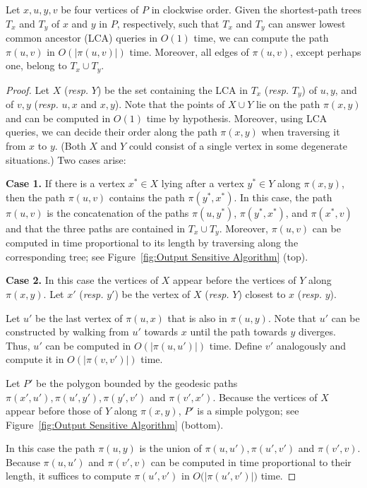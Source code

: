 \documentclass[a4paper,UKenglish]{lipics}
\newcommand{\p}[2]{\ensuremath{\pi(#1, #2)}}
\begin{document}
\begin{lemma}\label{lemma:Suri's lemma}
Let $x, u, y, v$ be four vertices of $P$ in clockwise order.
Given the shortest-path trees $T_x$ and $T_y$ of $x$ and $y$ in $P$, respectively, such that $T_x$ and $T_y$ can answer lowest common ancestor (LCA) queries in $O(1)$ time, 
we can compute the path $\p{u}{v}$ in $O(|\p{u}{v}|)$ time. 
Moreover, all edges of $\p{u}{v}$, except perhaps one, belong to $T_x\cup T_y$.
\end{lemma}
\begin{proof}
Let $X$ (\emph{resp.} $Y$) be the set containing the LCA in $T_x$ (\emph{resp.} $T_y$) of $u,y$, and of $v,y$ (\emph{resp.} $u,x$ and $x,y$). Note that the points of $X\cup Y$ lie on the path $\p{x}{y}$ and can be computed in $O(1)$ time by hypothesis. Moreover, using LCA queries, we can decide their order along the path $\p{x}{y}$ when traversing it from $x$ to $y$. (Both $X$ and $Y$ could consist of a single vertex in some degenerate situations.) Two cases arise: 

\textbf{Case 1.} If there is a vertex  $x^*\in X$ lying after a vertex $y^*\in Y$ along $\p{x}{y}$, 
then the path $\p{u}{v}$ contains the path $\p{y^*}{x^*}$. 
In this case, the path $\p{u}{v}$ is the concatenation of the paths $\p{u}{y^*}$, $\p{y^*}{x^*}$, and $\p{x^*}{v}$ and that the three paths are contained in $T_x \cup T_y$.
Moreover, $\p{u}{v}$ can be computed in time proportional to its length by traversing along the corresponding tree; see Figure~\ref{fig:Output Sensitive Algorithm} (top).

\textbf{Case 2.} In this case the vertices of $X$ appear before the vertices of $Y$ along $\p{x}{y}$.
Let $x'$ (\emph{resp.} $y'$) be the vertex of $X$ (\emph{resp.} $Y$) closest to $x$ (\emph{resp.} $y$). 

Let $u'$ be the last vertex of $\p{u}{x}$ that is also in $\p{u}{y}$.
Note that $u'$ can be constructed by walking from $u'$ towards $x$ until the path towards $y$ diverges. 
Thus, $u'$ can be computed in $O(|\p{u}{u'}|)$ time. 
Define $v'$ analogously and compute it in $O(|\p{v}{v'}|)$ time.

Let $P'$ be the polygon bounded by the geodesic paths $\p{x'}{u'}, \p{u'}{y'}, \p{y'}{v'}$ and  $\p{v'}{x'}$.
Because the vertices of $X$ appear before those of $Y$ along $\p{x}{y}$, $P'$ is a simple polygon; see Figure~\ref{fig:Output Sensitive Algorithm} (bottom).

In this case the path $\p{u}{y}$ is the union of $\p{u}{u'}, \p{u'}{v'}$ and $\p{v'}{v}$.
Because $\p{u}{u'}$ and  $\p{v'}{v}$ can be computed in time proportional to their length, it suffices to compute $\p{u'}{v'}$ in $O(|$\p{u'}{v'}$|)$ time.


\end{proof}
\end{document}
